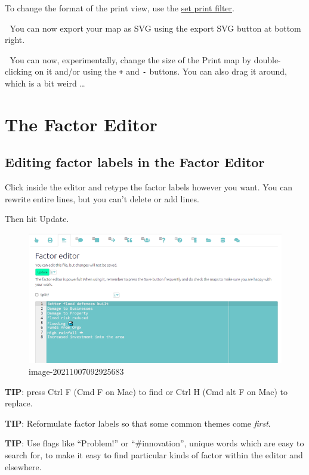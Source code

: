 \documentclass[
]{book}
\begin{document}
To change the format of the print view, use the \protect\hyperlink{xsimple-formats}{set print filter}.

🧪 You can now export your map as SVG using the export SVG button at bottom right.

🧪 You can now, experimentally, change the size of the Print map by double-clicking on it and/or using the \texttt{+} and \texttt{-} buttons. You can also drag it around, which is a bit weird \ldots{}

\hypertarget{xfactor-editor}{%
\chapter{The Factor Editor}\label{xfactor-editor}}

\hypertarget{editing-factor-labels-in-the-factor-editor}{%
\section{Editing factor labels in the Factor Editor}\label{editing-factor-labels-in-the-factor-editor}}

Click inside the editor and retype the factor labels however you want. You can rewrite entire lines, but you can't delete or add lines.

Then hit Update.

\begin{figure}
\centering
\includegraphics[width=6.77083in,height=\textheight]{_assets/image-20211007092925683.png}
\caption{image-20211007092925683}
\end{figure}

\textbf{TIP}: press Ctrl F (Cmd F on Mac) to find or Ctrl H (Cmd alt F on Mac) to replace.

\textbf{TIP}: Reformulate factor labels so that some common themes come \emph{first}.

\textbf{TIP}: Use flags like ``Problem!'' or ``\#innovation'', unique words which are easy to search for, to make it easy to find particular kinds of factor within the editor and elsewhere.
\end{document}
